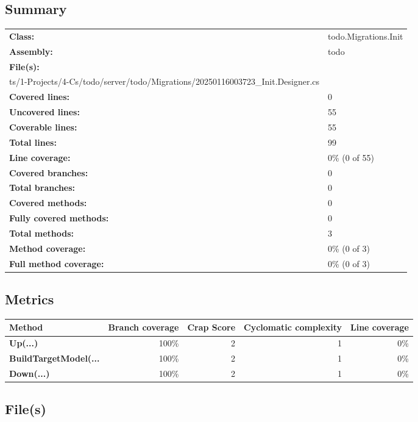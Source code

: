 \documentclass[a4paper,landscape,10pt]{article}
\begin{document}
\subsection{Summary}
\begin{longtable}[l]{ll}
\textbf{Class:} & todo.Migrations.Init\\
\textbf{Assembly:} & todo\\
\textbf{File(s):} & \begin{minipage}[t]{12cm}{tio/Objects/1-Projects/4-Cs/todo/server/todo/Migrations/20250116003723\_Init.cs\\ts/1-Projects/4-Cs/todo/server/todo/Migrations/20250116003723\_Init.Designer.cs}\end{minipage} \\
\textbf{Covered lines:} & 0\\
\textbf{Uncovered lines:} & 55\\
\textbf{Coverable lines:} & 55\\
\textbf{Total lines:} & 99\\
\textbf{Line coverage:} & 0\% (0 of 55)\\
\textbf{Covered branches:} & 0\\
\textbf{Total branches:} & 0\\
\textbf{Covered methods:} & 0\\
\textbf{Fully covered methods:} & 0\\
\textbf{Total methods:} & 3\\
\textbf{Method coverage:} & 0\% (0 of 3)\\
\textbf{Full method coverage:} & 0\% (0 of 3)\\
\end{longtable}
\subsection{Metrics}
\begin{longtable}[l]{|l|r|r|r|r|}
\hline
\textbf{Method} & \textbf{Branch coverage} & \textbf{Crap Score} & \textbf{Cyclomatic complexity} & \textbf{Line coverage}\\
\hline
\textbf{Up(...)} & 100\% & 2 & 1 & 0\%\\
\hline
\textbf{BuildTargetModel(...} & 100\% & 2 & 1 & 0\%\\
\hline
\textbf{Down(...)} & 100\% & 2 & 1 & 0\%\\
\hline
\end{longtable}
\subsection{File(s)}
\end{document}
